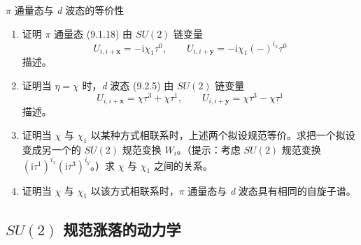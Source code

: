 $\pi$ 通量态与 \emph{d} 波态的等价性

\begin{enumerate}
\item 证明 $\pi$ 通量态 (9.1.18) 由 $SU(2)$ 链变量
\begin{equation*}
U_{i,i+\pmb{x}}=-\mathrm{i}\chi_1\tau^0,\qquad U_{i,i+\pmb{y}}=-\mathrm{i}\chi_1(-)^{i_x}\tau^0
\end{equation*}
描述。
\item 证明当 $\eta=\chi$ 时，\emph{d} 波态 (9.2.5) 由 $SU(2)$ 链变量
\begin{equation*}
U_{i,i+\pmb{x}}=\chi\tau^3+\chi\tau^1,\qquad U_{i,i+\pmb{y}}=\chi\tau^3-\chi\tau^1
\end{equation*}
描述。
\item 证明当 $\chi$ 与 $\chi_1$ 以某种方式相联系时，上述两个拟设规范等价。求把一个拟设变成另一个的 $SU(2)$ 规范变换 $W_i$。（提示：考虑 $SU(2)$ 规范变换 $(\mathrm{i}\tau^1)^{i_x}(\mathrm{i}\tau^3)^{i_y}$。）求 $\chi$ 与 $\chi_1$ 之间的关系。
\item 证明当 $\chi$ 与 $\chi_1$ 以该方式相联系时，$\pi$ 通量态与 \emph{d} 波态具有相同的自旋子谱。
\end{enumerate}

\subsection{$SU(2)$ 规范涨落的动力学}

